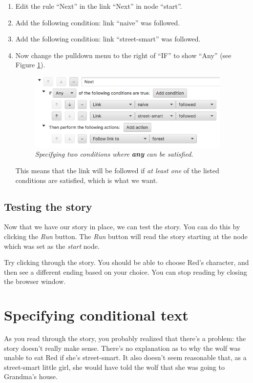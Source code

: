 \documentclass{article}
\begin{document}
\begin{enumerate}
  \item Edit the rule ``Next'' in the link ``Next'' in node ``start''.
  \item Add the following condition: link ``naive'' was followed.
  \item Add the following condition: link ``street-smart'' was followed.
  \item Now change the pulldown menu to the right of ``IF'' to show ``Any'' (see Figure \ref{fig:tut2:any_condition}).

\begin{figure}[h]
  \centering
  \includegraphics[width=10cm]{images/hypedyn-tutorial-2-figure-7}
  \caption{\textit{Specifying two conditions where \textbf{any} can be
  satisfied.}}
  \label{fig:tut2:any_condition}
\end{figure} 

This means that the link will be followed if \textit{at least one} of the listed conditions are satisfied, which is what we want.

\end{enumerate}

\subsection{Testing the story}

Now that we have our story in place, we can test the story. You can do this by clicking the \textit{Run} button. The \textit{Run} button will read the story starting at the node which was set as the \textit{start} node.

Try clicking through the story. You should be able to choose Red's character, and then see a different ending based on your choice. You can stop reading by closing the browser window.

\section{Specifying conditional text}

As you read through the story, you probably realized that there's a problem: the story doesn't really make sense. There's no explanation as to why the wolf was unable to eat Red if she's street-smart. It also doesn't seem reasonable that, as a street-smart little girl, she would have told the wolf that she was going to Grandma's house.
\end{document}
